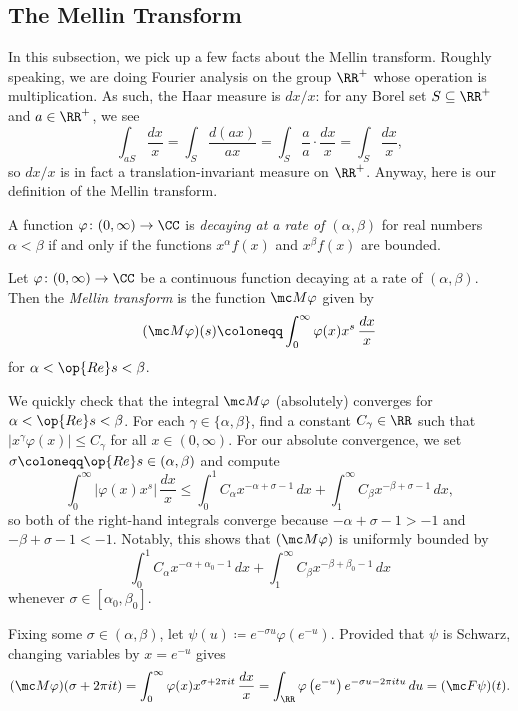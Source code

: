 \documentclass[../notes.tex]{subfiles}
\begin{document}
\subsection{The Mellin Transform}
In this subsection, we pick up a few facts about the Mellin transform. Roughly speaking, we are doing Fourier analysis on the group $\RR^+$ whose operation is multiplication. As such, the Haar measure is $dx/x$: for any Borel set $S\subseteq\RR^+$ and $a\in\RR^+$, we see
\[\int_{aS}\frac{dx}x=\int_S\frac{d(ax)}{ax}=\int_S\frac aa\cdot\frac{dx}x=\int_S\frac{dx}x,\]
so $dx/x$ is in fact a translation-invariant measure on $\RR^+$. Anyway, here is our definition of the Mellin transform.
\begin{definition}[decaying]
	A function $\varphi\colon(0,\infty)\to\CC$ is \textit{decaying at a rate of $(\alpha,\beta)$} for real numbers $\alpha<\beta$ if and only if the functions $x^\alpha f(x)$ and $x^\beta f(x)$ are bounded.
\end{definition}
\begin{definition}
	Let $\varphi\colon(0,\infty)\to\CC$ be a continuous function decaying at  a rate of $(\alpha,\beta)$. Then the \textit{Mellin transform} is the function $\mc M\varphi$ given by
	\[(\mc M\varphi)(s)\coloneqq\int_0^\infty\varphi(x)x^s\,\frac{dx}x\]
	for $\alpha<\op{Re}s<\beta$.
\end{definition}
\begin{remark} \label{rem:bound-mellin}
	We quickly check that the integral $\mc M\varphi$ (absolutely) converges for $\alpha<\op{Re}s<\beta$. For each $\gamma\in\{\alpha,\beta\}$, find a constant $C_\gamma\in\RR$ such that $\left|x^\gamma\varphi(x)\right|\le C_\gamma$ for all $x\in(0,\infty)$. For our absolute convergence, we set $\sigma\coloneqq\op{Re}s\in(\alpha,\beta)$ and compute
	\[\int_0^\infty\left|\varphi(x)x^s\right|\,\frac{dx}x\le \int_0^1C_\alpha x^{-\alpha+\sigma-1}\,dx+\int_1^\infty C_\beta x^{-\beta+\sigma-1}\,dx,\]
	so both of the right-hand integrals converge because $-\alpha+\sigma-1>-1$ and $-\beta+\sigma-1<-1$. Notably, this shows that $(\mc M\varphi)$ is uniformly bounded by
	\[\int_0^1C_\alpha x^{-\alpha+\alpha_0-1}\,dx+\int_1^\infty C_\beta x^{-\beta+\beta_0-1}\,dx\]
	whenever $\sigma\in[\alpha_0,\beta_0]$.
\end{remark}
\begin{remark} \label{rem:mellin-to-fourier}
	Fixing some $\sigma\in(\alpha,\beta)$, let $\psi(u)\coloneqq e^{-\sigma u}\varphi\left(e^{-u}\right)$. Provided that $\psi$ is Schwarz, changing variables by $x=e^{-u}$ gives
	\[(\mc M\varphi)(\sigma+2\pi it)=\int_0^\infty\varphi(x)x^{\sigma+2\pi it}\,\frac{dx}x=\int_\RR\varphi\left(e^{-u}\right)e^{-\sigma u-2\pi itu}\,du=(\mc F\psi)(t).\]
\end{remark}
\end{document}
